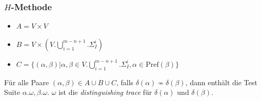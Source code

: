 \documentclass[10pt]{beamer}
\begin{document}
\begin{frame}
  \frametitle{$H$-Methode}
  \begin{itemize}
    \item $A=V\times V$
  	\item $B=V\times (V.\bigcup\limits_{i=1}^{m-n+1}.\Sigma_I^i)$
  	\item $C=\{(\alpha,\beta)|\alpha,\beta\in V.\bigcup\limits_{i=1}^{m-n+1}.\Sigma_I^i, \alpha \in \text{Pref}(\beta)\}$
  \end{itemize}
  Für alle Paare $(\alpha, \beta) \in A\cup B \cup C$, falls $\delta(\alpha) \not \sim \delta(\beta)$, dann enthält die Test Suite $\alpha.\omega,\beta.\omega$. $\omega$ ist die \emph{distinguishing trace} für $\delta(\alpha)$ und $\delta(\beta)$.
\end{frame}
\end{document}

